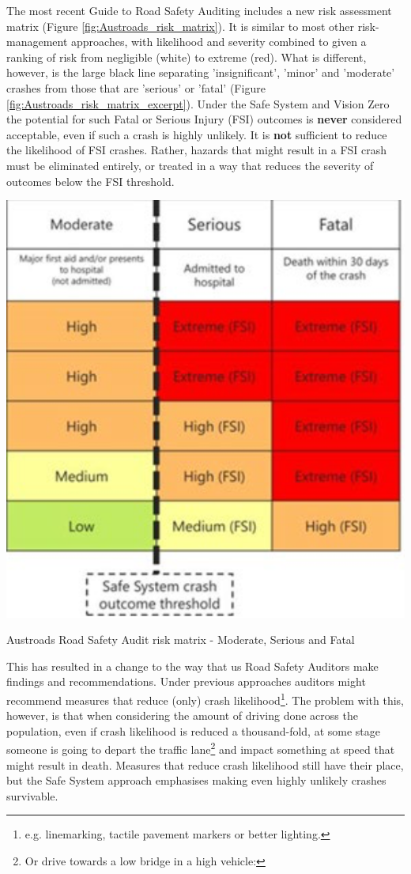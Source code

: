 \documentclass{tufte-handout}
\begin{document}
The most recent Guide to Road Safety Auditing\cite{Hillier:2022aa} includes a new risk assessment matrix (Figure \ref{fig:Austroads_risk_matrix}). It is similar to most other risk-management approaches, with likelihood and severity combined to given a ranking of risk from negligible (white) to extreme (red). What is different, however, is the large black line separating 'insignificant', 'minor' and 'moderate' crashes from those that are 'serious' or 'fatal' (Figure \ref{fig:Austroads_risk_matrix_excerpt}).  Under the Safe System and Vision Zero the potential for such Fatal or Serious Injury (FSI) outcomes is \textbf{never} considered acceptable, even if such a crash is highly unlikely.  It is \textbf{not} sufficient to reduce the likelihood of FSI crashes. Rather, hazards that might result in a FSI crash must be eliminated entirely, or treated in a way that reduces the severity of outcomes below the FSI threshold.   


\begin{marginfigure}
\includegraphics{Austroads_risk_matrix_excerpt}
\caption{Austroads Road Safety Audit risk matrix - Moderate, Serious and Fatal}
\label{fig:Austroads_risk_matrix_excerpt}
\end{marginfigure}


This has resulted in a change to the way that us Road Safety Auditors make findings and recommendations. Under previous approaches auditors might recommend measures that reduce (only)  crash likelihood\footnote{e.g. linemarking, tactile pavement markers or better lighting.}. The problem with this, however, is that when considering the amount of driving done across the population, even if crash likelihood is reduced a thousand-fold, at some stage someone is going to depart the traffic lane\footnote{Or drive towards a low bridge in a high vehicle:\cite{Reynolds:2019aa}} and impact something at speed that might result in death. Measures that reduce crash likelihood still have their place, but the Safe System approach emphasises making even highly unlikely crashes survivable. 
\end{document}
